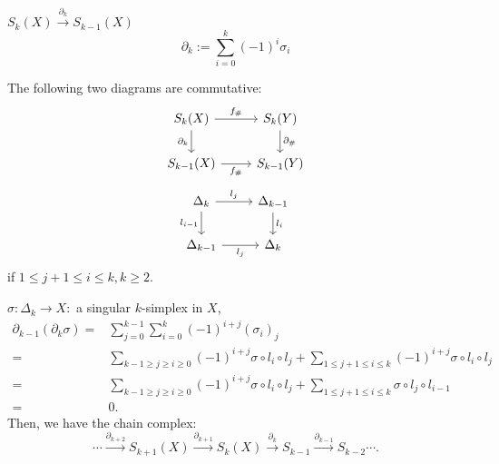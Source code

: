 \begin{definition}
 $S_k(X)\xrightarrow{\partial_k}S_{k-1}(X)$ 
 \[
   \partial_k:=\sum_{i=0}^{k} (-1)^{i}\sigma_i
 \] 
\end{definition}
\begin{exercise}
  The following two diagrams are commutative:
  \[
  \begin{tikzcd}
    S_k(X)\arrow{r}{f_{\#}} \arrow[swap]{d}{\partial_k} &S_k(Y)\arrow{d}{\partial_{\#}} \\
    S_{k-1}(X)\arrow[swap]{r}{f_{\#}} & S_{k-1}(Y)
  \end{tikzcd}
  \]
  \[
 \begin{tikzcd}
   \Delta_k \arrow[swap]{d}{l_{i-1}} \arrow{r}{l_j}&\Delta_{k-1}\arrow{d}{l_i}\\
   \Delta_{k-1}\arrow[swap]{r}{l_j}&\Delta_{k} 
 \end{tikzcd} 
  \] 
  if $1\le j+1\le i\le k, k\ge2$.
\end{exercise}
\begin{definition}
  $\sigma:\Delta_k\to X:$ a singular $k$-simplex in $X$,
  \begin{align*}
    \partial_{k-1}\left( \partial_k\sigma \right) =&\sum_{j=0}^{k-1} \sum_{i=0}^{k} (-1)^{i+j}(\sigma_i)_j\\
    =& \sum_{k-1\ge j\ge i\ge 0}^{} (-1)^{i+j}\sigma\circ l_i\circ l_j+\sum_{1\le j+1\le i\le k}^{} (-1)^{i+j}\sigma\circ l_i\circ l_j\\
    =&\sum_{k-1\ge j\ge i\ge 0}^{} (-1)^{i+j}\sigma\circ l_i\circ l_j+\sum_{1\le j+1\le i\le k}^{} \sigma\circ l_j\circ l_{i-1}\\
    =&0
  .\end{align*}
Then, we have the chain complex:
\[
  \cdots\xrightarrow{\partial_{k+2}}S_{k+1}(X)\xrightarrow{\partial_{k+1}} S_{k}(X)\xrightarrow{\partial_k} S_{k-1}\xrightarrow{\partial_{k-1}}S_{k-2}\cdots.
\] 
\end{definition}
